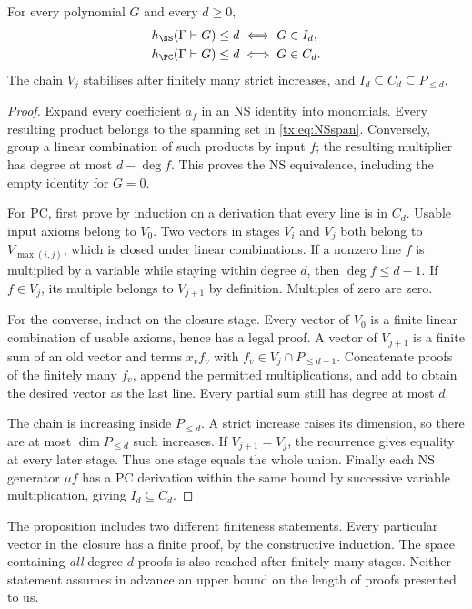 \begin{proposition}\label{tx:prop:closure}
For every polynomial $G$ and every $d\ge0$,
\[
 \begin{aligned}
 h_{\NS}(\Gamma\vdash G)\le d&\iff G\in I_d,\\
 h_{\PC}(\Gamma\vdash G)\le d&\iff G\in C_d.
 \end{aligned}
\]
The chain $V_j$ stabilises after finitely many strict increases, and
$I_d\subseteq C_d\subseteq P_{\le d}$.
\end{proposition}
\begin{proof}
Expand every coefficient $a_f$ in an NS identity into monomials.
Every resulting product belongs to the spanning set in
\eqref{tx:eq:NSspan}. Conversely, group a linear combination of such
products by input $f$; the resulting multiplier has degree at most
$d-\deg f$. This proves the NS equivalence, including the empty
identity for $G=0$.

For PC, first prove by induction on a derivation that every line is in
$C_d$. Usable input axioms belong to $V_0$. Two vectors in stages $V_i$
and $V_j$ both belong to $V_{\max(i,j)}$, which is closed under linear
combinations. If a nonzero line $f$ is multiplied by a variable while
staying within degree $d$, then $\deg f\le d-1$. If $f\in V_j$, its
multiple belongs to $V_{j+1}$ by definition. Multiples of zero are zero.

For the converse, induct on the closure stage. Every vector of $V_0$
is a finite linear combination of usable axioms, hence has a legal
proof. A vector of $V_{j+1}$ is a finite sum of an old vector and
terms $x_vf_v$ with $f_v\in V_j\cap P_{\le d-1}$. Concatenate proofs
of the finitely many $f_v$, append the permitted multiplications, and
add to obtain the desired vector as the last line. Every partial sum
still has degree at most $d$.

The chain is increasing inside $P_{\le d}$. A strict increase raises
its dimension, so there are at most $\dim P_{\le d}$ such increases.
If $V_{j+1}=V_j$, the recurrence gives equality at every later stage.
Thus one stage equals the whole union. Finally each NS generator
$\mu f$ has a PC derivation within the same bound by successive
variable multiplication, giving $I_d\subseteq C_d$.
\end{proof}

The proposition includes two different finiteness statements. Every
particular vector in the closure has a finite proof, by the constructive
induction. The space containing \emph{all} degree-$d$ proofs is also
reached after finitely many stages. Neither statement assumes in advance
an upper bound on the length of proofs presented to us.

